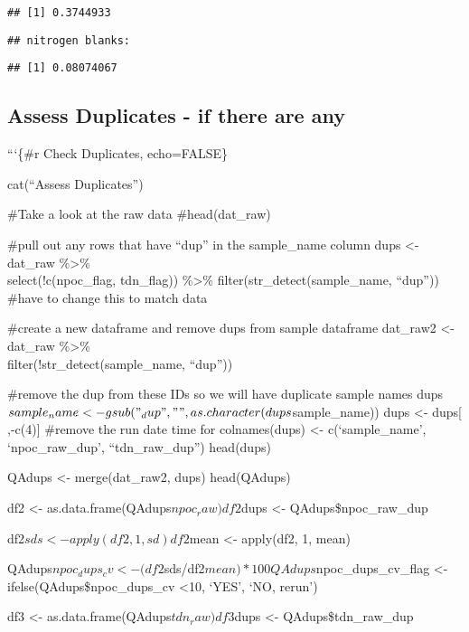 \documentclass[
]{article}
\begin{document}
\begin{verbatim}
## [1] 0.3744933
\end{verbatim}

\begin{verbatim}
## nitrogen blanks:
\end{verbatim}

\begin{verbatim}
## [1] 0.08074067
\end{verbatim}

\newpage

\hypertarget{assess-duplicates---if-there-are-any}{%
\subsection{Assess Duplicates - if there are
any}\label{assess-duplicates---if-there-are-any}}

```\{\#r Check Duplicates, echo=FALSE\}

cat(``Assess Duplicates'')

\#Take a look at the raw data \#head(dat\_raw)

\#pull out any rows that have ``dup'' in the sample\_name column dups
\textless- dat\_raw \%\textgreater\%\\
select(!c(npoc\_flag, tdn\_flag)) \%\textgreater\%
filter(str\_detect(sample\_name, ``dup'')) \#have to change this to
match data

\#create a new dataframe and remove dups from sample dataframe dat\_raw2
\textless- dat\_raw \%\textgreater\%\\
filter(!str\_detect(sample\_name, ``dup''))

\#remove the dup from these IDs so we will have duplicate sample names
dups\(sample_name<-gsub("_dup","",as.character(dups\)sample\_name)) dups
\textless- dups{[} ,-c(4){]} \#remove the run date time for
colnames(dups) \textless- c(`sample\_name', `npoc\_raw\_dup',
``tdn\_raw\_dup'') head(dups)

QAdups \textless- merge(dat\_raw2, dups) head(QAdups)

df2 \textless- as.data.frame(QAdups\(npoc_raw) df2\)dups \textless-
QAdups\$npoc\_raw\_dup

df2\(sds <- apply(df2,1,sd) df2\)mean \textless- apply(df2, 1, mean)

QAdups\(npoc_dups_cv <- (df2\)sds/df2\(mean) * 100 QAdups\)npoc\_dups\_cv\_flag
\textless- ifelse(QAdups\$npoc\_dups\_cv \textless10, `YES', `NO,
rerun')

df3 \textless- as.data.frame(QAdups\(tdn_raw) df3\)dups \textless-
QAdups\$tdn\_raw\_dup
\end{document}
